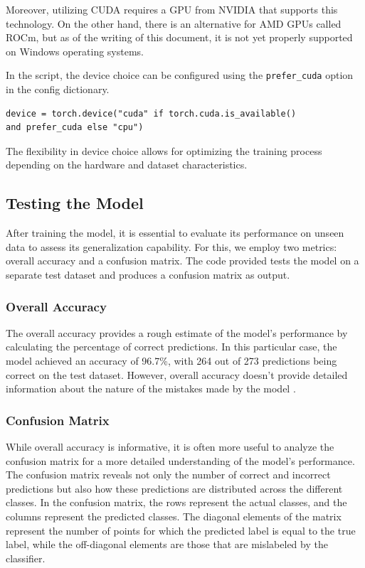 Moreover, utilizing CUDA requires a GPU from NVIDIA that supports this technology. On the other hand, there is an alternative for AMD GPUs called ROCm, but as of the writing of this document, it is not yet properly supported on Windows operating systems.

In the script, the device choice can be configured using the \verb|prefer_cuda| option in the config dictionary.

\begin{verbatim}
device = torch.device("cuda" if torch.cuda.is_available()
and prefer_cuda else "cpu")
\end{verbatim}

The flexibility in device choice allows for optimizing the training process depending on the hardware and dataset characteristics.

\subsection{Testing the Model}

After training the model, it is essential to evaluate its performance on unseen data to assess its generalization capability. For this, we employ two metrics: overall accuracy and a confusion matrix. The code provided tests the model on a separate test dataset and produces a confusion matrix as output.

\subsubsection{Overall Accuracy}

The overall accuracy provides a rough estimate of the model's performance by calculating the percentage of correct predictions. In this particular case, the model achieved an accuracy of 96.7\%, with 264 out of 273 predictions being correct on the test dataset. However, overall accuracy doesn't provide detailed information about the nature of the mistakes made by the model \cite[p. 148 ff.]{ketkar21}.

\subsubsection{Confusion Matrix}

While overall accuracy is informative, it is often more useful to analyze the confusion matrix for a more detailed understanding of the model's performance. The confusion matrix reveals not only the number of correct and incorrect predictions but also how these predictions are distributed across the different classes. In the confusion matrix, the rows represent the actual classes, and the columns represent the predicted classes. The diagonal elements of the matrix represent the number of points for which the predicted label is equal to the true label, while the off-diagonal elements are those that are mislabeled by the classifier.

